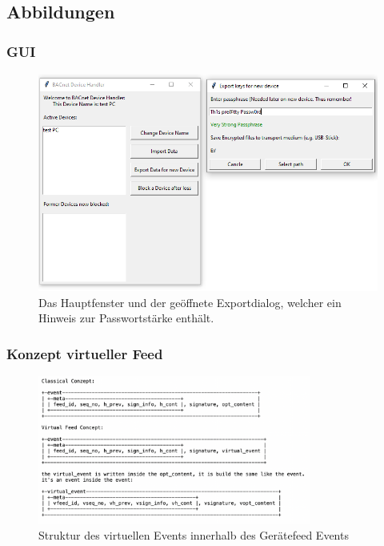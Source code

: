 \documentclass[a4paper,titlepage]{article}
\begin{document}
\newpage

	\subsection{Abbildungen}
		\subsubsection{GUI} 	\label{fig:UI}
		\begin{figure}[H] %
			\centering
			\includegraphics[width=1\textwidth]{figures/UIexport}
			\caption*{Das Hauptfenster und der geöffnete Exportdialog, welcher ein Hinweis zur Passwortstärke enthält.}
		\end{figure}
		
		\subsubsection{Konzept virtueller Feed}
		\begin{figure}[h!]
   		\centering
   		\includegraphics[width=0.8\textwidth]{figures/vFeedStructure}  
   		\caption*{Struktur des virtuellen Events innerhalb des Gerätefeed Events }
   		\label{fig-virtual_event_structure}
\end{figure}
		
\end{document}
